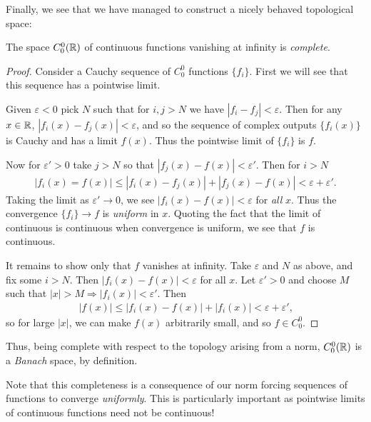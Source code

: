       Finally, we see that we have managed to construct a nicely behaved topological space:
      \begin{thm}
        The space $C^0_0(\mathbb{R})$ of continuous functions vanishing at infinity is \emph{complete}.
      \end{thm}
      \begin{proof}
        Consider a Cauchy sequence of $C^0_0$ functions $\{f_i\}$.
        First we will see that this sequence has a pointwise limit.

        Given $\varepsilon<0$ pick $N$ such that for $i,j>N$ we have $|f_i-f_j|<\varepsilon$.
        Then for any $x\in\mathbb{R}$, $|f_i(x)-f_j(x)|<\varepsilon$, and so the sequence of complex outputs $\{f_i(x)\}$ is Cauchy and has a limit $f(x)$.
        Thus the pointwise limit of $\{f_i\}$ is $f$.
       
        Now for $\varepsilon'>0$ take $j>N$ so that $|f_j(x)-f(x)|<\varepsilon'$.
        Then for $i>N$
        \begin{align*}
          |f_i(x)=f(x)|\le|f_i(x)-f_j(x)|+|f_j(x)-f(x)|<\varepsilon+\varepsilon'\text{.}
        \end{align*}
        Taking the limit as $\varepsilon'\rightarrow0$, we see $|f_i(x)-f(x)|<\varepsilon$ for \emph{all} $x$.
        Thus the convergence $\{f_i\}\rightarrow f$ is \emph{uniform} in $x$.
        Quoting the fact that the limit of continuous is continuous when convergence is uniform, we see that $f$ is continuous.\footnotemark

        It remains to show only that $f$ vanishes at infinity.
        Take $\varepsilon$ and $N$ as above, and fix some $i>N$.
        Then $|f_i(x)-f(x)|<\varepsilon$ for all $x$.
        Let $\varepsilon'>0$ and choose $M$ such that $|x|>M\Rightarrow |f_i(x)|<\varepsilon'$.
        Then
        \begin{align*}
          |f(x)|\le|f_i(x)-f(x)|+|f_i(x)|<\varepsilon+\varepsilon'\text{,}
        \end{align*}
        so for large $|x|$, we can make $f(x)$ arbitrarily small, and so $f\in C^0_0$.
      \end{proof}
      \begin{rmk}
        Thus, being complete with respect to the topology arising from a norm, $C^0_0(\mathbb{R})$ is a \emph{Banach} space, by definition.
      \end{rmk}
      \begin{rmk}
        Note that this completeness is a consequence of our norm forcing sequences of functions to converge \emph{uniformly}.
        This is particularly important as pointwise limits of continuous functions need not be continuous!
      \end{rmk}

